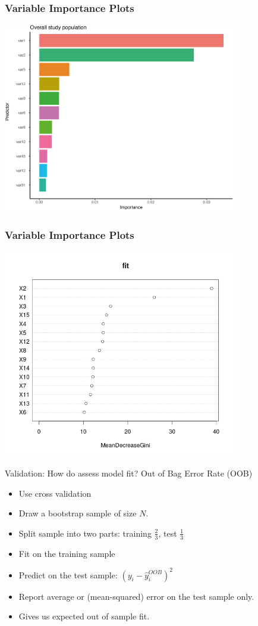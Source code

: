 \documentclass[xcolor=pdftex,dvipsnames,table,mathserif,aspectratio=169]{beamer}
\begin{document}
\begin{frame}
\frametitle{Variable Importance Plots}
\includegraphics[width=4in]{./resources/Importance.jpg}
\end{frame}

\begin{frame}
\frametitle{Variable Importance Plots}
\includegraphics[width=4in]{./resources/variable-importance.png}
\end{frame}


\begin{frame}{Validation: How do assess model fit?}
Out of Bag Error Rate (OOB)
\begin{itemize}
\item Use \alert{cross validation}
\item Draw a bootstrap sample of size $N$.
\item Split sample into two parts: training $\frac{2}{3}$, test $\frac{1}{3}$
\item Fit on the training sample
\item Predict on the test sample: $(y_i - \hat{y}_i^{OOB})^2$
\item Report average or (mean-squared) error on the test sample only.
\item Gives us expected out of sample fit.
\end{itemize}
\end{frame}
\end{document}
